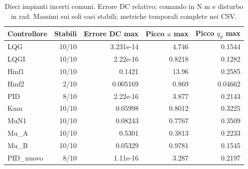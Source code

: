\par
\begin{table}[htbp]\centering\small
\setlength{\tabcolsep}{4pt}
\begin{tabular}{lrrrr}\toprule
Controllore & Stabili & Errore DC max & Picco $u$ max & Picco $q_d$ max\\\midrule
LQG & 10/10 & 3.231e-14 & 4.746 & 0.1544\\
LQGI & 10/10 & 2.22e-16 & 0.8218 & 0.1282\\
Hinf1 & 10/10 & 0.1421 & 13.96 & 0.2585\\
Hinf2 & 2/10 & 0.005169 & 0.869 & 0.04662\\
PID & 8/10 & 2.22e-16 & 3.877 & 0.2143\\
Kmu & 10/10 & 0.05998 & 0.8012 & 0.3225\\
MuN1 & 10/10 & 0.08243 & 0.7767 & 0.3509\\
Mu\_A & 10/10 & 0.5301 & 0.3813 & 0.2233\\
Mu\_B & 10/10 & 0.05329 & 0.9781 & 0.1545\\
PID\_nuovo & 8/10 & 1.11e-16 & 3.287 & 0.2197\\
\bottomrule\end{tabular}
\caption{Dieci impianti incerti comuni. Errore DC relativo; comando in N m e disturbo in rad. Massimi sui soli casi stabili; metriche temporali complete nei CSV.}
\end{table}
\par
